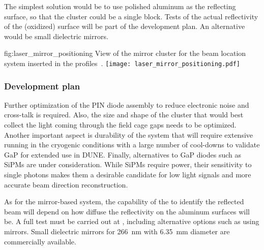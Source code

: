The simplest solution would be to use polished aluminum as the reflecting surface, so that the cluster could be a single block. 
Tests of the actual reflectivity of the (oxidized) surface will be part of the development plan.  An alternative would be small dielectric mirrors.

\begin{dunefigure}{fig:laser_mirror_positioning}
{View of the mirror cluster for the beam location system inserted in the  profiles~\cite{bib:yu2019a}.}
\texttt{[image: laser\_mirror\_positioning.pdf]}
\end{dunefigure}


\subsubsection{Development plan}
 Further optimization of the PIN diode %
 assembly to reduce electronic noise and cross-talk is required. Also, the size and shape of the cluster that would best collect the light coming through the field cage gaps needs to be optimized.  Another important aspect is durability of the system that will require extensive running in the cryogenic conditions with  a large number of cool-downs to validate GaP for extended use in DUNE. Finally, alternatives to GaP diodes such as SiPMs are under consideration. While SiPMs require power, their sensitivity to single photons makes them a desirable candidate for low light signals and more accurate beam direction reconstruction. 

As for the mirror-based system, the capability of the  to identify the reflected beam will depend on how diffuse the reflectivity on the aluminum surfaces will be. A full test must be carried out at , including alternative options such as using mirrors. Small dielectric mirrors for \SI{266}{\nano\m} with \SI{6.35}{\milli\m} diameter are commercially available.


